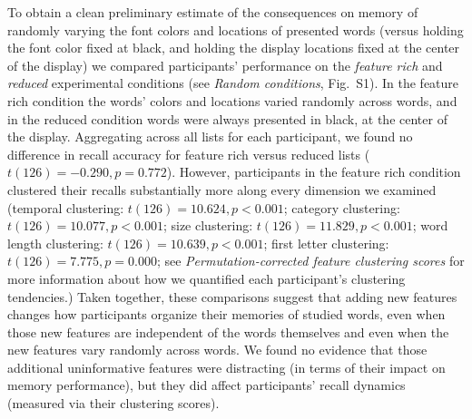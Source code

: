 \documentclass[11pt]{article}
\newcommand{\dynamicsRandom}{S1}
\begin{document}
To obtain a clean preliminary estimate of the consequences on memory of
randomly varying the font colors and locations of presented words (versus
holding the font color fixed at black, and holding the display locations fixed
at the center of the display) we compared participants' performance on the
\textit{feature rich} and \textit{reduced} experimental conditions (see
\textit{Random conditions}, Fig.~\dynamicsRandom). In the feature rich
condition the words' colors and locations varied randomly across words, and in
the reduced condition words were always presented in black, at the center of
the display. Aggregating across all lists for each participant, we found no
difference in recall accuracy for feature rich versus reduced lists ($t(126) =
-0.290, p = 0.772$). However, participants in the feature rich condition
clustered their recalls substantially more along every dimension we examined
(temporal clustering: $t(126) = 10.624, p < 0.001$; category clustering:
$t(126) = 10.077, p < 0.001$; size clustering: $t(126) = 11.829, p < 0.001$;
word length clustering: $t(126) = 10.639, p < 0.001$; first letter clustering:
$t(126) = 7.775, p = 0.000$; see \textit{Permutation-corrected feature
clustering scores} for more information about how we quantified each
participant's clustering tendencies.) Taken together, these comparisons suggest
that adding new features changes how participants organize their memories of
studied words, even when those new features are independent of the words
themselves and even when the new features vary randomly across words. We found
no evidence that those additional uninformative features were distracting (in
terms of their impact on memory performance), but they did affect participants'
recall dynamics (measured via their clustering scores).
\end{document}
